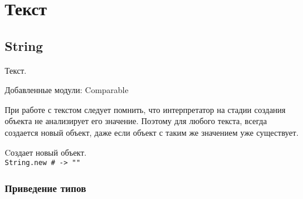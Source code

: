 \chapter{Текст}

\section{String}

Текст.

Добавленные модули: Comparable

При работе с текстом следует помнить, что интерпретатор на стадии создания объекта не анализирует его значение. Поэтому для любого текста, всегда создается новый объект, даже если объект с таким же значением уже существует.
\begin{methodlist}
  Cоздает новый объект.
  \\\verb!String.new # -> ""!
\end{methodlist}

\subsection*{Приведение типов}

